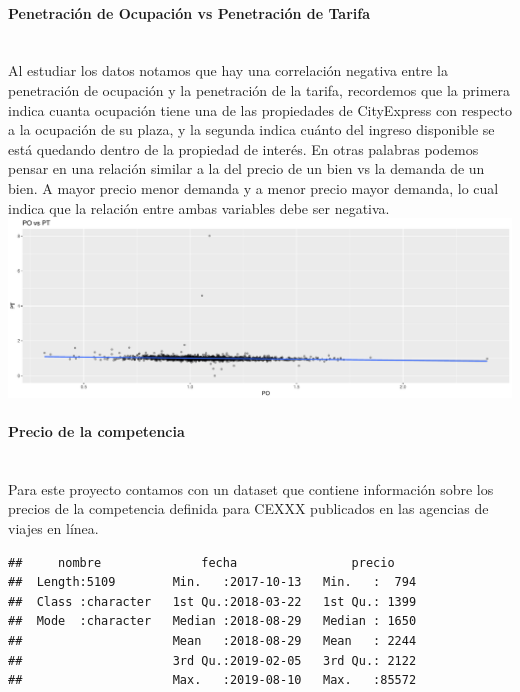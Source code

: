 \documentclass{article}\usepackage[]{graphicx}\usepackage[]{color}
\makeatletter
\def\maxwidth{ %
  \ifdim\Gin@nat@width>\linewidth
    \linewidth
  \else
    \Gin@nat@width
  \fi
}
\newenvironment{kframe}{%
 \def\at@end@of@kframe{}%
 \ifinner\ifhmode%
  \def\at@end@of@kframe{\end{minipage}}%
  \begin{minipage}{\columnwidth}%
 \fi\fi%
 \def\FrameCommand##1{\hskip\@totalleftmargin \hskip-\fboxsep
 \colorbox{shadecolor}{##1}\hskip-\fboxsep
     \hskip-\linewidth \hskip-\@totalleftmargin \hskip\columnwidth}%
 \MakeFramed {\advance\hsize-\width
   \@totalleftmargin\z@ \linewidth\hsize
   \@setminipage}}%
 {\par\unskip\endMakeFramed%
 \at@end@of@kframe}
\newenvironment{knitrout}{}{} %
\makeatother
\begin{document}
\paragraph{Penetración de Ocupación vs Penetración de Tarifa} ~\\
Al estudiar los datos notamos que hay una correlación negativa entre la penetración de ocupación y la penetración de la tarifa, recordemos que la primera indica cuanta ocupación tiene una de las propiedades de CityExpress con respecto a la ocupación de su plaza, y la segunda indica cuánto del ingreso disponible se está quedando dentro de la propiedad de interés. En otras palabras podemos pensar en una relación similar a la del precio de un bien vs la demanda de un bien. A mayor precio menor demanda y a menor precio mayor demanda, lo cual indica que la relación entre ambas variables debe ser negativa.
~\\
\begin{knitrout}
\color{fgcolor}
\includegraphics[width=\maxwidth]{figures/POvsPT-1} 

\end{knitrout}
\paragraph{Precio de la competencia} ~\\
Para este proyecto contamos con un dataset que contiene información sobre los precios de la competencia definida para CEXXX publicados en las agencias de viajes en línea.
~\\
\begin{knitrout}
\color{fgcolor}\begin{kframe}
\begin{verbatim}
##     nombre              fecha                precio     
##  Length:5109        Min.   :2017-10-13   Min.   :  794  
##  Class :character   1st Qu.:2018-03-22   1st Qu.: 1399  
##  Mode  :character   Median :2018-08-29   Median : 1650  
##                     Mean   :2018-08-29   Mean   : 2244  
##                     3rd Qu.:2019-02-05   3rd Qu.: 2122  
##                     Max.   :2019-08-10   Max.   :85572
\end{verbatim}
\end{kframe}
\end{knitrout}
\end{document}

